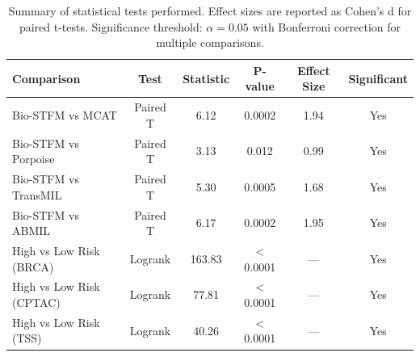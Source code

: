 \begin{table}[htbp]
\centering
\small
\caption{Summary of statistical tests performed. Effect sizes are reported as Cohen's d for paired t-tests. Significance threshold: $\alpha = 0.05$ with Bonferroni correction for multiple comparisons.}
\label{tab:statistics}
\begin{tabular}{lccccc}
\toprule
\textbf{Comparison} & \textbf{Test} & \textbf{Statistic} & \textbf{P-value} & \textbf{Effect Size} & \textbf{Significant} \\
\midrule
Bio-STFM vs MCAT & Paired T & 6.12 & 0.0002 & 1.94 & Yes \\
\addlinespace[0.5ex]
Bio-STFM vs Porpoise & Paired T & 3.13 & 0.012 & 0.99 & Yes \\
\addlinespace[0.5ex]
Bio-STFM vs TransMIL & Paired T & 5.30 & 0.0005 & 1.68 & Yes \\
\addlinespace[0.5ex]
Bio-STFM vs ABMIL & Paired T & 6.17 & 0.0002 & 1.95 & Yes \\
\addlinespace[0.5ex]
High vs Low Risk (BRCA) & Logrank & 163.83 & < 0.0001 & — & Yes \\
\addlinespace[0.5ex]
High vs Low Risk (CPTAC) & Logrank & 77.81 & < 0.0001 & — & Yes \\
\addlinespace[0.5ex]
High vs Low Risk (TSS) & Logrank & 40.26 & < 0.0001 & — & Yes \\
\bottomrule
\end{tabular}
\end{table}